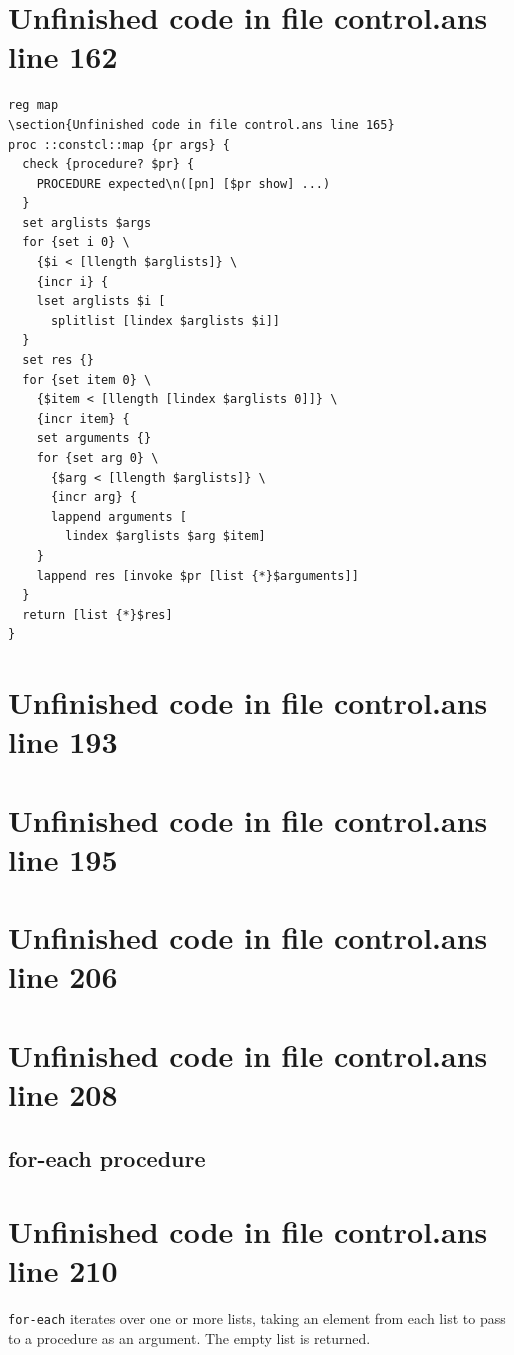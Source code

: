 \documentclass[twoside,9pt]{report}
\begin{document}
\section{Unfinished code in file control.ans line 162}
\begin{lstlisting}
reg map
\section{Unfinished code in file control.ans line 165}
proc ::constcl::map {pr args} {
  check {procedure? $pr} {
    PROCEDURE expected\n([pn] [$pr show] ...)
  }
  set arglists $args
  for {set i 0} \
    {$i < [llength $arglists]} \
    {incr i} {
    lset arglists $i [
      splitlist [lindex $arglists $i]]
  }
  set res {}
  for {set item 0} \
    {$item < [llength [lindex $arglists 0]]} \
    {incr item} {
    set arguments {}
    for {set arg 0} \
      {$arg < [llength $arglists]} \
      {incr arg} {
      lappend arguments [
        lindex $arglists $arg $item]
    }
    lappend res [invoke $pr [list {*}$arguments]]
  }
  return [list {*}$res]
}
\end{lstlisting}
\section{Unfinished code in file control.ans line 193}
\section{Unfinished code in file control.ans line 195}
\section{Unfinished code in file control.ans line 206}
\section{Unfinished code in file control.ans line 208}
\subsection{for-each procedure}
\label{for-each-procedure}
\index{for-each procedure}
\section{Unfinished code in file control.ans line 210}


\texttt{for-each} iterates over one or more lists, taking an element from each list to pass to a procedure as an argument. The empty list is returned.
\end{document}
